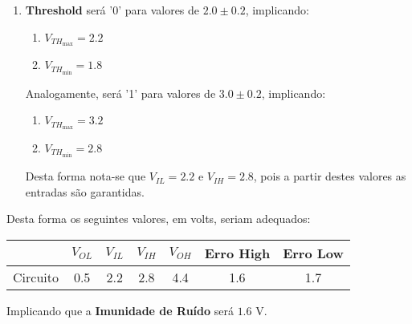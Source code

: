 \documentclass{article}
\begin{document}
\begin{resolution}
\begin{enumerate}[rightmargin = \leftmargin]
                        \item \textbf{Threshold} será '0' para valores de $2.0 \pm 0.2$, implicando:
                            \begin{enumerate}[noitemsep, rightmargin = \leftmargin]
                                \item $V_{TH_{\text{max}}} = 2.2$
                                \item $V_{TH_{\text{min}}} = 1.8$
                            \end{enumerate}
                        Analogamente, será '1' para valores de $3.0 \pm 0.2$, implicando:
                            \begin{enumerate}[noitemsep, rightmargin = \leftmargin]
                                \item $V_{TH_{\text{max}}} = 3.2$
                                \item $V_{TH_{\text{min}}} = 2.8$
                            \end{enumerate}
                        Desta forma nota-se que $V_{IL} = 2.2$ e $V_{IH} = 2.8$, pois a partir destes valores as entradas são garantidas.
                    \end{enumerate}
                Desta forma os seguintes valores, em volts, seriam adequados:
                    \begin{table}[H]
                        \centering  
                        \begin{tabular}[]{l|cccc|cc}\hline
                                     & $V_{OL}$ & $V_{IL}$ & $V_{IH}$ & $V_{OH}$ & Erro High & Erro Low\\\hline
                            Circuito & 0.5      & 2.2      & 2.8      & 4.4      & 1.6       & 1.7\\\hline
                        \end{tabular}
                    \end{table}
                Implicando que a \textbf{Imunidade de Ruído} será $\boxed{1.6 \text{ V}}$.
            \end{resolution}

\newpage
\end{document}
